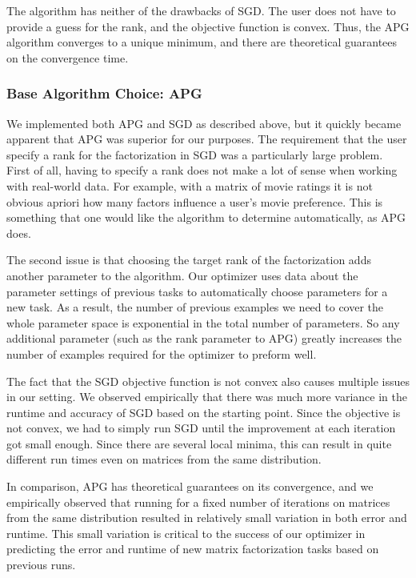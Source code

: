 The algorithm has neither of the drawbacks of SGD. The user does not have to provide a guess for the rank, and the objective function is convex. Thus, the APG algorithm converges to a unique minimum, and there are theoretical guarantees on the convergence time.

\subsubsection{Base Algorithm Choice: APG}
We implemented both APG and SGD as described above, but it quickly became apparent that APG was superior for our purposes. The requirement that the user specify a rank for the factorization in SGD was a particularly large problem. First of all, having to specify a rank does not make a lot of sense when working with real-world data. For example, with a matrix of movie ratings it is not obvious apriori how many factors influence a user's movie preference. This is something that one would like the algorithm to determine automatically, as APG does.

The second issue is that choosing the target rank of the factorization adds another parameter to the algorithm. Our optimizer uses data about the parameter settings of previous tasks to automatically choose parameters for a new task. As a result, the number of previous examples we need to cover the whole parameter space is exponential in the total number of parameters. So any additional parameter (such as the rank parameter to APG) greatly increases the number of examples required for the optimizer to preform well.

The fact that the SGD objective function is not convex also causes multiple issues in our setting. We observed empirically that there was much more variance in the runtime and accuracy of SGD based on the starting point. Since the objective is not convex, we had to simply run SGD until the improvement at each iteration got small enough. Since there are several local minima, this can result in quite different run times even on matrices from the same distribution. 

In comparison, APG has theoretical guarantees on its convergence, and we empirically observed that running for a fixed number of iterations on matrices from the same distribution resulted in relatively small variation in both error and runtime. This small variation is critical to the success of our optimizer in predicting the error and runtime of new matrix factorization tasks based on previous runs.

